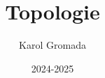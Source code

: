 \newcommand{\R}{\ensuremath{\mathbb{R}}}
\newcommand{\Z}{\ensuremath{\mathbb{Z}}}
\newcommand{\U}{\ensuremath{\mathcal{U}}}
\newcommand{\N}{\ensuremath{\mathbb{N}}}
\newcommand{\ra}{\ensuremath{\rightarrow}}
\newcommand{\lra}{\ensuremath{\longrightarrow}}


\renewcommand{\b}[1]{\ensuremath{\mathbf{#1}}}
\renewcommand{\H}{\ensuremath{\mathcal{H}}}

\newcommand{\ps}[2]{\ensuremath{\prescript{}{#1}{#2}}}


\DeclareMathOperator{\rang}{rang\hspace{0.8pt}}
\DeclareMathOperator{\id}{Id}
\DeclareMathOperator{\dist}{dist}
\DeclareMathOperator{\im}{Im}

\newcommand{\class}[1]{\ensuremath{\mathscr{C}^{#1}}}

\DeclareMathOperator{\lenop}{\mathbf{L}}
\newcommand{\len}[2]{\ensuremath{\lenop_{#1}^{#2}}}

\DeclarePairedDelimiter{\abs}{\lvert}{\rvert}%
\DeclarePairedDelimiter{\norm}{\lVert}{\rVert}%

\newcommand{\deriv}[1]{\ensuremath{\frac{\mathrm{d}}{\mathrm{d}#1}}}
\newcommand{\defeq}{\stackrel{\text{def}}{=}}

\renewcommand{\leq}{\leqslant}
\renewcommand{\geq}{\geqslant}
\newcommand{\Tau}{\mathcal{T}}

\newcommand{\Int}{\mathrm{Int}}
\newcommand{\Cl}{\mathrm{Cl}}


\title{\headingfont Topologie}	
\author{Karol Gromada}
\date{2024-2025}
